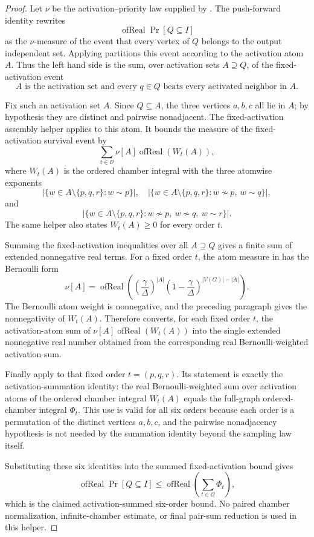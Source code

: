 \begin{proof}
Let $\nu$ be the activation--priority law supplied by
.  The push-forward identity
 rewrites
\[
\operatorname{ofReal}\Pr[Q\subseteq I]
\]
as the $\nu$-measure of the event that every vertex of $Q$ belongs to the
output independent set.  Applying
 partitions this event according
to the activation atom $A$.  Thus the left hand side is the sum, over
activation sets $A\supseteq Q$, of the fixed-activation event
\[
A\text{ is the activation set and every }q\in Q
\text{ beats every activated neighbor in }A .
\]

Fix such an activation set $A$.  Since $Q\subseteq A$, the three vertices
$a,b,c$ all lie in $A$; by hypothesis they are distinct and pairwise
nonadjacent.  The fixed-activation assembly helper
 applies to this
atom.  It bounds the measure of the fixed-activation survival event by
\[
\sum_{t\in\mathcal O}\nu[A]\operatorname{ofReal}(W_t(A)),
\]
where $W_t(A)$ is the ordered chamber integral with the three atomwise
exponents
\[
|\{w\in A\setminus\{p,q,r\}:w\sim p\}|,\quad
|\{w\in A\setminus\{p,q,r\}:w\not\sim p,\ w\sim q\}|,
\]
and
\[
|\{w\in A\setminus\{p,q,r\}:w\not\sim p,\ w\not\sim q,\ w\sim r\}|.
\]
The same helper also states $W_t(A)\ge0$ for every order $t$.

Summing the fixed-activation inequalities over all $A\supseteq Q$ gives a
finite sum of extended nonnegative real terms.  For a fixed order $t$, the
atom measure in  has the Bernoulli
form
\[
\nu[A]=\operatorname{ofReal}\left(
\left(\frac{\gamma}{\Delta}\right)^{|A|}
\left(1-\frac{\gamma}{\Delta}\right)^{|V(G)|-|A|}
\right).
\]
The Bernoulli atom weight is nonnegative, and the preceding paragraph gives
the nonnegativity of $W_t(A)$.  Therefore
 converts, for each
fixed order $t$, the activation-atom sum of
$\nu[A]\operatorname{ofReal}(W_t(A))$ into the single extended nonnegative
real number obtained from the corresponding real Bernoulli-weighted activation
sum.

Finally apply  to that fixed
order $t=(p,q,r)$.  Its statement is exactly the activation-summation identity:
the real Bernoulli-weighted sum over activation atoms of the ordered chamber
integral $W_t(A)$ equals the full-graph ordered-chamber integral $\Phi_t$.
This use is valid for all six orders because each order is a permutation of
the distinct vertices $a,b,c$, and the pairwise nonadjacency hypothesis is not
needed by the summation identity beyond the sampling law itself.

Substituting these six identities into the summed fixed-activation bound gives
\[
\operatorname{ofReal}\Pr[Q\subseteq I]
\le
\operatorname{ofReal}\left(\sum_{t\in\mathcal O}\Phi_t\right),
\]
which is the claimed activation-summed six-order bound.  No paired chamber
normalization, infinite-chamber estimate, or final pair-sum reduction is used
in this helper.
\end{proof}
